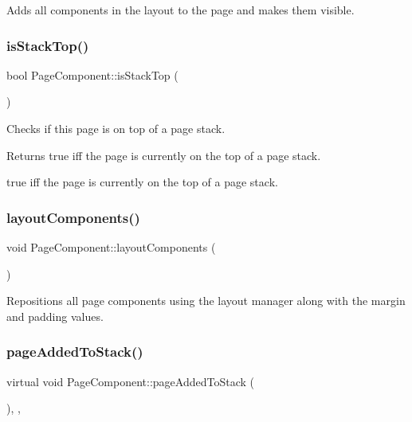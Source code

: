 Adds all components in the layout to the page and makes them visible. \mbox{\label{classPageComponent_a1ffe94ede2560dac8c2b1b9acef4192c}} 
\subsubsection{\texorpdfstring{is\+Stack\+Top()}{isStackTop()}}
{\footnotesize\ttfamily bool Page\+Component\+::is\+Stack\+Top (\begin{DoxyParamCaption}{ }\end{DoxyParamCaption})\hspace{0.3cm}{\ttfamily [protected]}}

Checks if this page is on top of a page stack.

\begin{DoxyReturn}{Returns}
true iff the page is currently on the top of a page stack.

true iff the page is currently on the top of a page stack. 
\end{DoxyReturn}
\mbox{\label{classPageComponent_a7c51a53665d56c9f2f33da194bdf99ab}} 
\subsubsection{\texorpdfstring{layout\+Components()}{layoutComponents()}}
{\footnotesize\ttfamily void Page\+Component\+::layout\+Components (\begin{DoxyParamCaption}{ }\end{DoxyParamCaption})\hspace{0.3cm}{\ttfamily [protected]}}

Repositions all page components using the layout manager along with the margin and padding values. \mbox{\label{classPageComponent_af31c1ed2264dfcbfd6ec1e32ee90fbef}} 
\subsubsection{\texorpdfstring{page\+Added\+To\+Stack()}{pageAddedToStack()}}
{\footnotesize\ttfamily virtual void Page\+Component\+::page\+Added\+To\+Stack (\begin{DoxyParamCaption}{ }\end{DoxyParamCaption})\hspace{0.3cm}{\ttfamily [inline]}, {\ttfamily [protected]}, {\ttfamily [virtual]}}

